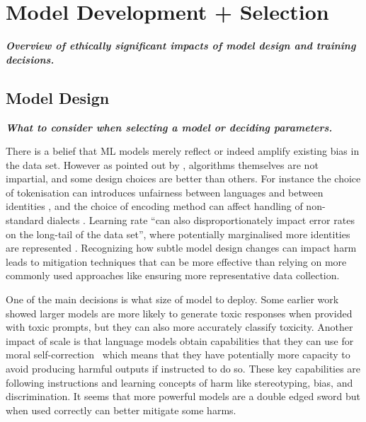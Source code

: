 \section{Model Development + Selection}\label{sec:modeldev}


\noindent\textbf{\textit{Overview of ethically significant impacts of model design and training decisions.}}
\newline 

\subsection{Model Design}\label{subsec:design}\noindent\textbf{\textit{What to consider when selecting a model or deciding parameters.}}
\newline 

\noindent There is a belief that ML models merely reflect or indeed amplify existing bias in the data set. However as pointed out by \citet{hooker_moving_2021}, algorithms themselves are not impartial, and some design choices are better than others. For instance the choice of tokenisation can introduces unfairness between languages \cite{petrov_language_2023} and between identities \citep{ovalle_are_2023}, and the choice of encoding method can affect handling of non-standard dialects \cite{tan_mind_2020}. Learning rate ``can also disproportionately impact error rates on the long-tail of the data set'', where potentially marginalised more identities are represented \citep{hooker_moving_2021}. Recognizing how subtle model design changes can impact harm leads to mitigation techniques that can be more effective than relying on more commonly used approaches like ensuring more representative  data collection.

One of the main decisions is what size of model to deploy. 
Some earlier work \citep{rae_scaling_2021} showed larger models are more likely to generate toxic responses when provided
with toxic prompts, but they can also more accurately classify toxicity. Another impact of scale is that language models obtain capabilities that they can use for moral self-correction~\cite{ganguli_capacity_2023, schick_self-diagnosis_2021} which means that they have potentially more capacity to avoid producing harmful outputs if instructed to do so. These key capabilities are following instructions and learning concepts of harm like stereotyping, bias, and discrimination. It seems that more powerful models are a double edged sword but when used correctly can better mitigate some harms. 

